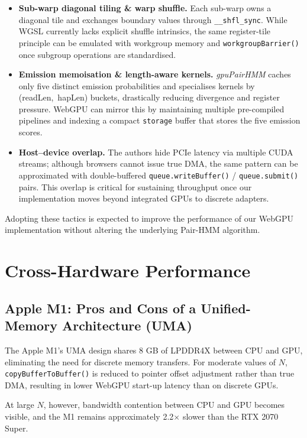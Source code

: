 \documentclass[PhD]{PHlab-thesis}
\begin{document}
\begin{itemize}
  \item \textbf{Sub-warp diagonal tiling \& warp shuffle.} Each sub-warp owns a diagonal tile and exchanges boundary values through \texttt{\_\_shfl\_sync}. While WGSL currently lacks explicit shuffle intrinsics, the same register-tile principle can be emulated with workgroup memory and \texttt{workgroupBarrier()} once subgroup operations are standardised.
  \item \textbf{Emission memoisation \& length-aware kernels.} \textit{gpuPairHMM} caches only five distinct emission probabilities and specialises kernels by (readLen,~hapLen) buckets, drastically reducing divergence and register pressure. WebGPU can mirror this by maintaining multiple pre-compiled pipelines and indexing a compact \texttt{storage} buffer that stores the five emission scores.
  \item \textbf{Host–device overlap.} The authors hide PCIe latency via multiple CUDA streams; although browsers cannot issue true DMA, the same pattern can be approximated with double-buffered \texttt{queue.writeBuffer()} / \texttt{queue.submit()} pairs. This overlap is critical for sustaining throughput once our implementation moves beyond integrated GPUs to discrete adapters.
\end{itemize}

Adopting these tactics is expected to improve the performance of our WebGPU implementation without altering the underlying Pair-HMM algorithm.



\section{Cross-Hardware Performance}
\subsection{Apple M1: Pros and Cons of a Unified-Memory Architecture (UMA)}
The Apple M1's UMA design shares 8 GB of LPDDR4X between CPU and GPU, eliminating the need for discrete memory transfers. For moderate values of $N$, \texttt{copyBufferToBuffer()} is reduced to pointer offset adjustment rather than true DMA, resulting in lower WebGPU start-up latency than on discrete GPUs.

At large $N$, however, bandwidth contention between CPU and GPU becomes visible, and the M1 remains approximately 2.2$\times$ slower than the RTX 2070 Super.
\end{document}
